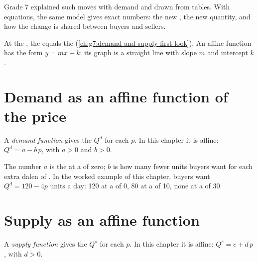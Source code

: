 Grade 7 explained such moves with demand and  drawn from tables. With equations, the same
model gives exact numbers: the new , the new quantity, and how the change is shared between buyers
and sellers.

\begin{recall}
At the , the  equals the 
(\cref{ch:g7:demand-and-supply-first-look}). An affine function has the form $y = m x + k$: its graph is
a straight line with slope $m$ and intercept $k$.
\end{recall}

\section{Demand as an affine function of the price}

\begin{definition}\label{def:g9:demand-and-supply-equations:demand-function}
A \emph{demand function} gives the  $Q^d$ for each  $p$.
In this chapter it is affine: $Q^d = a - b\,p$, with $a > 0$ and $b > 0$.
\end{definition}

The number $a$ is the  at a  of zero; $b$ is how many fewer units buyers want for
each extra dalen of . In the worked example of this chapter, buyers want $Q^d = 120 - 4p$ units a
day: 120 at a  of 0, 80 at a  of 10, none at a  of 30.

\section{Supply as an affine function}

\begin{definition}\label{def:g9:demand-and-supply-equations:supply-function}
A \emph{supply function} gives the  $Q^s$ for each  $p$.
In this chapter it is affine: $Q^s = c + d\,p$, with $d > 0$.
\end{definition}

